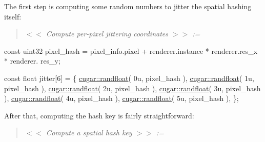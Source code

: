 \begin{DoxyParagraph}{}
The first step is computing some random numbers to jitter the spatial hashing itself\+:
\end{DoxyParagraph}
\label{_p_s_f_p_t_page_Compute_per-pixel_jittering_coordinates_anchor}%
%
\begin{quote}
{\itshape  $<$$<$ Compute per-\/pixel jittering coordinates $>$$>$ \+:= }

\end{quote}

\begin{DoxyCodeInclude}
            \textcolor{keyword}{const} uint32 pixel\_hash = pixel\_info.pixel + renderer.instance * renderer.res\_x * renderer.
      res\_y;

            \textcolor{keyword}{const} \textcolor{keywordtype}{float} jitter[6] = \{
                \hyperlink{group___basic_ga215e28e8a87955931f3cdb9b9797ff68}{cugar::randfloat}( 0u, pixel\_hash ),
                \hyperlink{group___basic_ga215e28e8a87955931f3cdb9b9797ff68}{cugar::randfloat}( 1u, pixel\_hash ),
                \hyperlink{group___basic_ga215e28e8a87955931f3cdb9b9797ff68}{cugar::randfloat}( 2u, pixel\_hash ),
                \hyperlink{group___basic_ga215e28e8a87955931f3cdb9b9797ff68}{cugar::randfloat}( 3u, pixel\_hash ),
                \hyperlink{group___basic_ga215e28e8a87955931f3cdb9b9797ff68}{cugar::randfloat}( 4u, pixel\_hash ),
                \hyperlink{group___basic_ga215e28e8a87955931f3cdb9b9797ff68}{cugar::randfloat}( 5u, pixel\_hash ),
            \};
\end{DoxyCodeInclude}
 \begin{DoxyParagraph}{}
After that, computing the hash key is fairly straightforward\+:
\end{DoxyParagraph}
\label{_p_s_f_p_t_page_Compute_a_spatial_hashkey_anchor}%
%
\begin{quote}
{\itshape  $<$$<$ Compute a spatial hash key $>$$>$ \+:= }

\end{quote}

